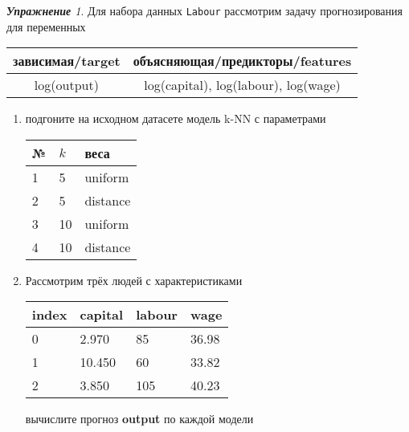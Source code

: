 \documentclass[a4,12pt]{article}
\theoremstyle{remark}
\newtheorem{exercise}{\textbf{Упражнение}}[section]
\begin{document}
\begin{exercise}
Для набора данных \texttt{Labour} рассмотрим задачу прогнозирования
для переменных
\begin{center}
	\begin{tabular}{|c|c|}\hline
		зависимая/target & объясняющая/предикторы/features \\ \hline
		log(output) & log(capital), log(labour), log(wage) \\ \hline
	\end{tabular}
\end{center}
\begin{enumerate}
	\item подгоните на исходном датасете модель k-NN с параметрами
	\begin{center}
		\begin{tabular}{|l|l|l|}\hline
		№ & \(k\) & веса \\ \hline
		1 & 5 & uniform \\
		2 & 5 & distance \\
		3 & 10 & uniform \\
		4 & 10 & distance \\ \hline
		\end{tabular}
	\end{center}
	\item Рассмотрим трёх людей с характеристиками
	\begin{center}
		\begin{tabular}{|l||l|l|l|}\hline
			index & capital & labour & wage \\ \hline\hline
			0 & 2.970 & 85 & 36.98\\
			1 & 10.450 & 60 & 33.82  \\
			2 & 3.850 & 105 & 40.23\\ \hline
		\end{tabular}
	\end{center}
	вычислите прогноз \textbf{output} по каждой модели
\end{enumerate}
\end{exercise}
\end{document}
